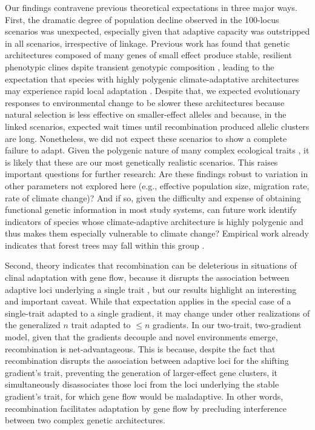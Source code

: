 \documentclass[9pt,twocolumn,twoside,lineno]{pnas-new}
\begin{document}
Our findings contravene previous theoretical expectations in
three major ways.
First, the dramatic degree of population decline observed in the 100-locus scenarios was unexpected,
especially given that adaptive capacity was outstripped in all scenarios, irrespective of 
linkage.
Previous work has found that genetic architectures composed
of many genes of small effect produce stable, resilient phenotypic clines dspite transient genotypic composition \cite{yeaman_amnat,yeaman_review},
leading to the expectation that species with highly polygenic climate-adaptative architectures 
may experience rapid local adaptation \cite{aitken_yeaman}. 
Despite that, we expected evolutionary responses to environmental change
to be slower these architectures
because natural selection is less effective on smaller-effect alleles
and because, in the linked scenarios,
expected wait times until recombination produced allelic clusters are long.
Nonetheless, we did not expect these scenarios to show a complete failure to adapt.
Given the polygenic nature of many complex ecological traits \cite{barghi_polygenic,boyle,rockman,savolainen,sella},
it is likely that these are our most genetically realistic scenarios.
This raises important questions for further research:
Are these findings robust to variation in other parameters
not explored here (e.g., effective population size, migration rate, rate of climate change)? 
And if so,
given the difficulty and expense of obtaining functional genetic
information in most study systems,
can future work identify indicators of species whose
climate-adaptive architecture is highly polygenic
and thus makes them especially vulnerable to climate change?
Empirical work already indicates
that forest trees may fall within this group
\cite{lind,aitken_yeaman}.


Second, theory indicates that recombination can be deleterious
in situations of clinal adaptation
with gene flow, because it disrupts the association between adaptive loci 
underlying a single trait \cite{tigano},
but our results highlight an interesting and important caveat.
While that expectation applies in the special case of a single-trait 
adapted to a single gradient,
it may change under other realizations of the 
generalized $n$ trait adapted to $\leq n$ gradients.
In our two-trait, two-gradient model, given that the gradients decouple
and novel environments emerge,
recombination is net-advantageous.
This is because, despite the fact that recombination disrupts the association between
adaptive loci for the shifting gradient's trait, preventing the
generation of larger-effect gene clusters,
it simultaneously disassociates those loci from the loci underlying
the stable gradient's trait, for which gene flow would be maladaptive.
In other words, recombination facilitates adaptation by gene flow
by precluding interference between two complex genetic architectures.
  
\end{document}
